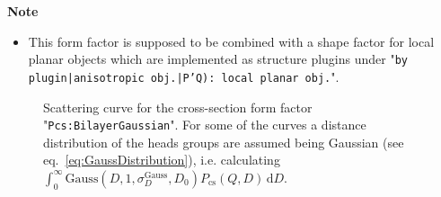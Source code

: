 \noindent
\textbf{Note}
\begin{itemize}
  \item This form factor is supposed to be combined with a shape factor for
local planar objects which are implemented as structure  plugins
under "\texttt{by plugin|anisotropic obj.|P'Q): local planar
obj.}".
\end{itemize}

\begin{figure}[htb]
\begin{center}
\hfill
{}
\end{center}
\caption{Scattering curve for the cross-section form factor "\texttt{Pcs:BilayerGaussian}". For some of the curves a distance distribution of
the heads groups are assumed being Gaussian (see eq.\ \ref{eq:GaussDistribution}), i.e. calculating
$\int_0^\infty \mathrm{Gauss}(D,1,\sigma_D^\textrm{Gauss},D_0) P_\text{cs}\left(Q,D\right)\, \mathrm{d}D$.}
\label{fig:BiLayerGaussianProfileIQ}
\end{figure}


